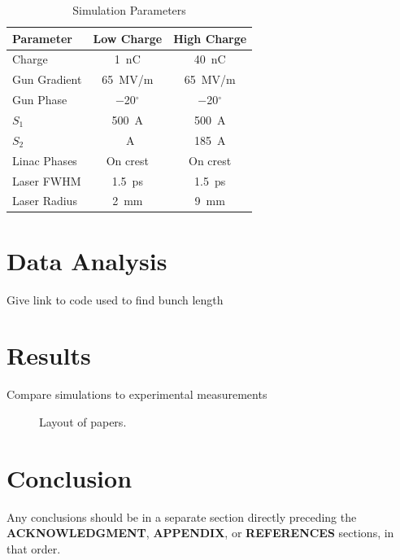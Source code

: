 \documentclass[letterpaper,  %
              ]{jacow-2_3}   %
\newcommand\SEC[1]{\textbf{\uppercase{#1}}}
\begin{document}
\begin{table}[hbt]
	\centering
	\caption{Simulation Parameters}
	\begin{tabular}{lcc}
		\toprule
		\textbf{Parameter} & \textbf{Low Charge}  & \textbf{High Charge} \\
		\midrule
		Charge       & \SI{1}{nC}        & \SI{40}{nC}    \\ %
		Gun Gradient & \SI{65}{MV/m}     & \SI{65}{MV/m}  \\ %
		Gun Phase    & \SI{-20}{}$^{\circ}$ & \SI{-20}{}$^{\circ}$ \\		 
		$S_1$        & \SI{500}{A}		 & \SI{500}{A}	  \\
		$S_2$		 & \SI{}{A}   	 & \SI{185}{A}		 \\
		Linac Phases & On crest          & On crest       \\
		Laser FWHM   & \SI{1.5}{ps}      & \SI{1.5}{ps}   \\ %
		Laser Radius & \SI{2}{mm}        & \SI{9}{mm}     \\
		\bottomrule
	\end{tabular}
	\label{simparam}
\end{table}


\section{Data Analysis}
Give link to code used to find bunch length

\section{Results}
Compare simulations to experimental measurements
\begin{figure}[!htb]
	\centering
	\caption{Layout of papers.}
	\label{l2ea4-f1}
\end{figure}

\section{Conclusion}
Any conclusions should be in a separate section directly preceding
the \SEC{Acknowledgment}, \SEC{Appendix}, or \SEC{References} sections, in that
order.
\end{document}
